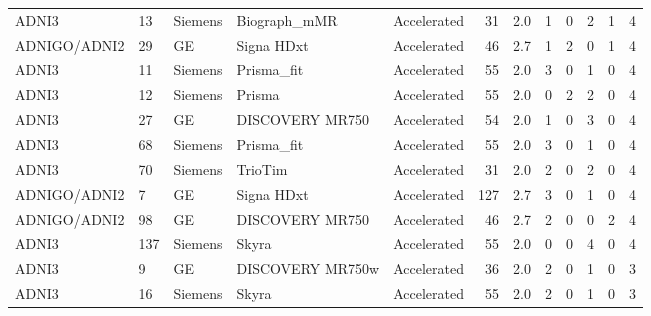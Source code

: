 \documentclass{article}
\providecommand{\DIFaddtex}[1]{{\protect\color{blue}#1}} %
\providecommand{\DIFadd}[1]{\texorpdfstring{\DIFaddtex{#1}}{#1}} %
\begin{document}
\begin{landscape}
\begin{longtable}{lllllrrrrrrr}
\DIFadd{ADNI3 }& \DIFadd{13 }& \DIFadd{Siemens }& \DIFadd{Biograph\_mMR }& \DIFadd{Accelerated }& \DIFadd{31 }& \DIFadd{2.0 }& \DIFadd{1 }& \DIFadd{0 }& \DIFadd{2 }& \DIFadd{1 }& \DIFadd{4 }\\
\DIFadd{ADNIGO/ADNI2 }& \DIFadd{29 }& \DIFadd{GE }& \DIFadd{Signa HDxt }& \DIFadd{Accelerated }& \DIFadd{46 }& \DIFadd{2.7 }& \DIFadd{1 }& \DIFadd{2 }& \DIFadd{0 }& \DIFadd{1 }& \DIFadd{4 }\\
\DIFadd{ADNI3 }& \DIFadd{11 }& \DIFadd{Siemens }& \DIFadd{Prisma\_fit }& \DIFadd{Accelerated }& \DIFadd{55 }& \DIFadd{2.0 }& \DIFadd{3 }& \DIFadd{0 }& \DIFadd{1 }& \DIFadd{0 }& \DIFadd{4 }\\
\DIFadd{ADNI3 }& \DIFadd{12 }& \DIFadd{Siemens }& \DIFadd{Prisma }& \DIFadd{Accelerated }& \DIFadd{55 }& \DIFadd{2.0 }& \DIFadd{0 }& \DIFadd{2 }& \DIFadd{2 }& \DIFadd{0 }& \DIFadd{4 }\\
\DIFadd{ADNI3 }& \DIFadd{27 }& \DIFadd{GE }& \DIFadd{DISCOVERY MR750 }& \DIFadd{Accelerated }& \DIFadd{54 }& \DIFadd{2.0 }& \DIFadd{1 }& \DIFadd{0 }& \DIFadd{3 }& \DIFadd{0 }& \DIFadd{4 }\\
\DIFadd{ADNI3 }& \DIFadd{68 }& \DIFadd{Siemens }& \DIFadd{Prisma\_fit }& \DIFadd{Accelerated }& \DIFadd{55 }& \DIFadd{2.0 }& \DIFadd{3 }& \DIFadd{0 }& \DIFadd{1 }& \DIFadd{0 }& \DIFadd{4 }\\
\DIFadd{ADNI3 }& \DIFadd{70 }& \DIFadd{Siemens }& \DIFadd{TrioTim }& \DIFadd{Accelerated }& \DIFadd{31 }& \DIFadd{2.0 }& \DIFadd{2 }& \DIFadd{0 }& \DIFadd{2 }& \DIFadd{0 }& \DIFadd{4 }\\
\DIFadd{ADNIGO/ADNI2 }& \DIFadd{7 }& \DIFadd{GE }& \DIFadd{Signa HDxt }& \DIFadd{Accelerated }& \DIFadd{127 }& \DIFadd{2.7 }& \DIFadd{3 }& \DIFadd{0 }& \DIFadd{1 }& \DIFadd{0 }& \DIFadd{4 }\\
\DIFadd{ADNIGO/ADNI2 }& \DIFadd{98 }& \DIFadd{GE }& \DIFadd{DISCOVERY MR750 }& \DIFadd{Accelerated }& \DIFadd{46 }& \DIFadd{2.7 }& \DIFadd{2 }& \DIFadd{0 }& \DIFadd{0 }& \DIFadd{2 }& \DIFadd{4 }\\
\DIFadd{ADNI3 }& \DIFadd{137 }& \DIFadd{Siemens }& \DIFadd{Skyra }& \DIFadd{Accelerated }& \DIFadd{55 }& \DIFadd{2.0 }& \DIFadd{0 }& \DIFadd{0 }& \DIFadd{4 }& \DIFadd{0 }& \DIFadd{4 }\\
\DIFadd{ADNI3 }& \DIFadd{9 }& \DIFadd{GE }& \DIFadd{DISCOVERY MR750w }& \DIFadd{Accelerated }& \DIFadd{36 }& \DIFadd{2.0 }& \DIFadd{2 }& \DIFadd{0 }& \DIFadd{1 }& \DIFadd{0 }& \DIFadd{3 }\\
\DIFadd{ADNI3 }& \DIFadd{16 }& \DIFadd{Siemens }& \DIFadd{Skyra }& \DIFadd{Accelerated }& \DIFadd{55 }& \DIFadd{2.0 }& \DIFadd{2 }& \DIFadd{0 }& \DIFadd{1 }& \DIFadd{0 }& \DIFadd{3 }\\

\end{longtable}
\end{landscape}
\end{document}
